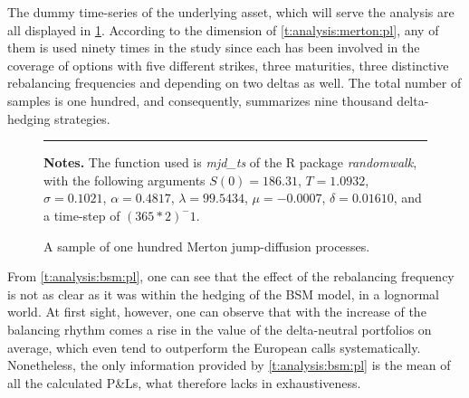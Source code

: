 \documentclass[12pt]{report}
\begin{document}
The dummy time-series of the underlying asset, which will serve the analysis are all displayed in \cref{p:analysis:mjd:100}. 
According to the dimension of \cref{t:analysis:merton:pl}, any of them is used ninety times in the study since each has been involved in the coverage of options with five different strikes, three maturities, three distinctive rebalancing frequencies and depending on two deltas as well.
The total number of samples is one hundred, and consequently,  summarizes nine thousand delta-hedging strategies.

\begin{figure}[h]
  \centering
  \rule{40mm}{20mm}
  \caption{A sample of one hundred Merton jump-diffusion processes.}
  \begin{changemargin}{0.5cm}{0.5cm}
  \medskip
\footnotesize
{}\textbf{Notes.} The function used is \textit{mjd\_ts} of the R package \textit{randomwalk}, with the following arguments $S(0) = 186.31$, $T = 1.0932$, $\sigma = 0.1021$, $\alpha = 0.4817$, $\lambda = 99.5434$, $\mu = -0.0007$, $\delta = 0.01610$, and a time-step of $(365 * 2)^-1$.
  \end{changemargin}
  \label{p:analysis:mjd:100}
\end{figure}













From \cref{t:analysis:bsm:pl}, one can see that the effect of the rebalancing frequency is not as clear as it was within the hedging of the BSM model, in a lognormal world.
At first sight, however, one can observe that with the increase of the balancing rhythm comes a rise in the value of the delta-neutral portfolios on average, which even tend to outperform the European calls systematically.
Nonetheless, the only information provided by \cref{t:analysis:bsm:pl} is the mean of all the calculated P\&Ls, what therefore lacks in exhaustiveness.
\end{document}

